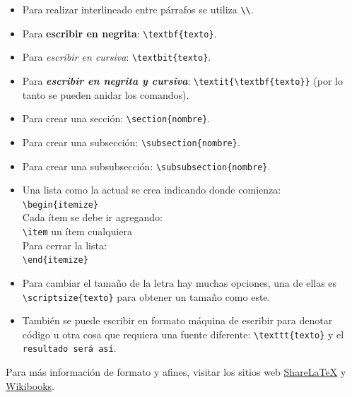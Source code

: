 \documentclass[10pt,]{article}
\begin{document}
\begin{itemize}
\item Para realizar interlineado entre párrafos se utiliza \verb!\\!.
\item Para \textbf{escribir en negrita}: \verb!\textbf{texto}!.
\item Para \textit{escribir en cursiva}: \verb!\textbit{texto}!.
\item Para \textit{\textbf{escribir en negrita y cursiva}}: \verb!\textit{\textbf{texto}}! (por lo tanto se pueden anidar los comandos).
\item Para crear una sección: \verb!\section{nombre}!.
\item Para crear una subsección: \verb!\subsection{nombre}!.
\item Para crear una subsubsección: \verb!\subsubsection{nombre}!.
\item Una lista como la actual se crea indicando donde comienza:\\
\verb!\begin{itemize}!\\
Cada ítem se debe ir agregando:\\
\verb!\item! un ítem cualquiera\\
Para cerrar la lista:\\
\verb!\end{itemize}!\\
\item Para cambiar el tamaño de la letra hay muchas opciones, una de ellas es \verb!\scriptsize{texto}! para obtener \scriptsize{un tamaño como este}\normalsize{.} %
\item También se puede escribir en formato máquina de escribir para denotar código u otra cosa que requiera una fuente diferente: \verb!\texttt{texto}! y el \texttt{resultado será así}.
\end{itemize}

Para más información de formato y afines, visitar los sitios web \href{https://es.sharelatex.com/learn}{Share\LaTeX} y \href{https://en.wikibooks.org/wiki/LaTeX}{Wikibooks}.\\
\end{document}
